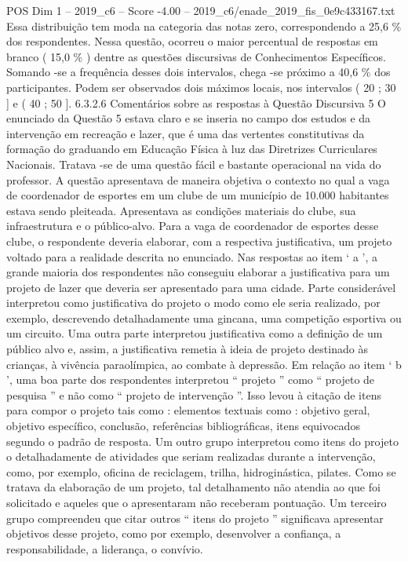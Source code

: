 \begin{textsample}{POS Dim 1 – 2019\_c6 – Score -4.00 – 2019\_c6/enade\_2019\_fis\_0e9c433167.txt}
Essa distribuição tem moda na categoria das notas zero, correspondendo a 25,6 \% dos respondentes.
Nessa questão, ocorreu o maior percentual de respostas em branco ( 15,0 \% ) dentre as questões discursivas de Conhecimentos Específicos.
Somando -se a frequência desses dois intervalos, chega -se próximo a 40,6 \% dos participantes.
Podem ser observados dois máximos locais, nos intervalos ( 20 ; 30 ] e ( 40 ; 50 ]. 6.3.2.6 Comentários sobre as respostas à Questão Discursiva 5 O enunciado da Questão 5 estava claro e se inseria no campo dos estudos e da intervenção em recreação e lazer, que é uma das vertentes constitutivas da formação do graduando em Educação Física à luz das Diretrizes Curriculares Nacionais.
Tratava -se de uma questão fácil e bastante operacional na vida do professor.
A questão apresentava de maneira objetiva o contexto no qual a vaga de coordenador de esportes em um clube de um município de 10.000 habitantes estava sendo pleiteada.
Apresentava as condições materiais do clube, sua infraestrutura e o público-alvo.
Para a vaga de coordenador de esportes desse clube, o respondente deveria elaborar, com a respectiva justificativa, um projeto voltado para a realidade descrita no enunciado.
Nas respostas ao item ‘ a ’, a grande maioria dos respondentes não conseguiu elaborar a justificativa para um projeto de lazer que deveria ser apresentado para uma cidade.
Parte considerável interpretou como justificativa do projeto o modo como ele seria realizado, por exemplo, descrevendo detalhadamente uma gincana, uma competição esportiva ou um circuito.
Uma outra parte interpretou justificativa como a definição de um público alvo e, assim, a justificativa remetia à ideia de projeto destinado às crianças, à vivência paraolímpica, ao combate à depressão.
Em relação ao item ‘ b ’, uma boa parte dos respondentes interpretou “ projeto ” como “ projeto de pesquisa ” e não como “ projeto de intervenção ”.
Isso levou à citação de itens para compor o projeto tais como : elementos textuais como : objetivo geral, objetivo específico, conclusão, referências bibliográficas, itens equivocados segundo o padrão de resposta.
Um outro grupo interpretou como itens do projeto o detalhadamente de atividades que seriam realizadas durante a intervenção, como, por exemplo, oficina de reciclagem, trilha, hidroginástica, pilates.
Como se tratava da elaboração de um projeto, tal detalhamento não atendia ao que foi solicitado e aqueles que o apresentaram não receberam pontuação.
Um terceiro grupo compreendeu que citar outros “ itens do projeto ” significava apresentar objetivos desse projeto, como por exemplo, desenvolver a confiança, a responsabilidade, a liderança, o convívio.

\end{textsample}

